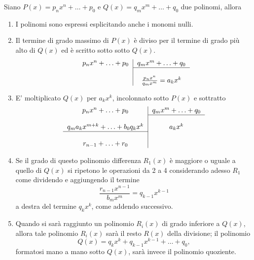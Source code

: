 \begin{definition}\label{def:algoritmo_divisione_polinomi}
    Siano $P(x)=p_nx^n+\hdots+ p_0$ e $Q(x)=q_mx^m+\hdots+q_0$ due \gls{polinomi}, allora
    \begin{enumerate}
        \item I polinomi sono espressi esplicitando anche i monomi nulli.
        \item Il termine di grado massimo di $P(x)$ è diviso per il  termine di grado più alto di $Q(x)$ ed è scritto sotto sotto $Q(x)$.\\
        \begin{equation*}
        	\begin{tabular}{c|c}
        		$ p_nx^n+\hdots+ p_0$ & $q_mx^m+\hdots+q_0$\\
        		\cline{2-2}\\
        		& $\frac{p_nx^n}{q_mx^m}=a_kx^k$
        	\end{tabular}
        \end{equation*}
        \item E' moltiplicato $Q(x)$ per $a_kx^k$, incolonnato sotto $P(x)$ e sottratto\\
        \begin{equation*}
        	\begin{tabular}{c|c}
        		$ p_nx^n+\hdots+ p_0$ & $q_mx^m+\hdots+q_0$\\
        		\cline{2-2}\\
        		$q_ma_kx^{m+k}+\hdots + b_0q_kx^k$ & $a_kx^k$\\
        		\cline{1-1}\\
        		$r_{n-1}+\hdots+r_0$&\\
        	\end{tabular}
        \end{equation*}
        \item Se il grado di questo polinomio differenza $R_1(x)$ è maggiore o uguale a quello di $Q(x)$ si ripetono le operazioni da 2 a 4 considerando adesso $R_1$ come dividendo e aggiungendo il termine 
        \begin{equation*}
            \frac {r_{n-1}x^{n-1}}{b_{m}x^{m}}=q_{k-1}x^{k-1}
        \end{equation*}
        a destra del termine $q_{k}x^{k}$, come addendo successivo.
        \item Quando si sarà raggiunto un polinomio $R_{i}(x)$ di grado inferiore a $Q(x)$, allora tale polinomio $R_{i}(x)$ sarà il resto $R(x)$ della divisione; il polinomio
        \begin{equation*}
             Q(x)=q_{k}x^{k}+q_{k-1}x^{k-1}+\hdots+q_{0},
        \end{equation*}
        formatosi mano a mano sotto $Q(x)$, sarà invece il polinomio quoziente. 
    \end{enumerate}
\end{definition}

